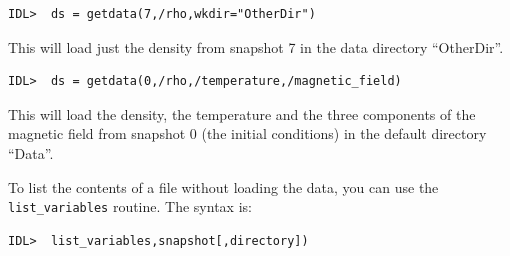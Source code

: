 \documentclass[11pt]{article}
\begin{document}
\begin{verbatim}
IDL>  ds = getdata(7,/rho,wkdir="OtherDir")
\end{verbatim}
This will load just the density from snapshot 7 in the data directory ``OtherDir''.

\begin{verbatim}
IDL>  ds = getdata(0,/rho,/temperature,/magnetic_field)
\end{verbatim}
This will load the density, the temperature and the three components of the magnetic field from snapshot 0 
(the initial conditions) in the default directory ``Data''.

To list the contents of a file without loading the data, you can use the \texttt{list\_variables} routine. The syntax is:

\begin{verbatim}
IDL>  list_variables,snapshot[,directory])
\end{verbatim}
\end{document}
